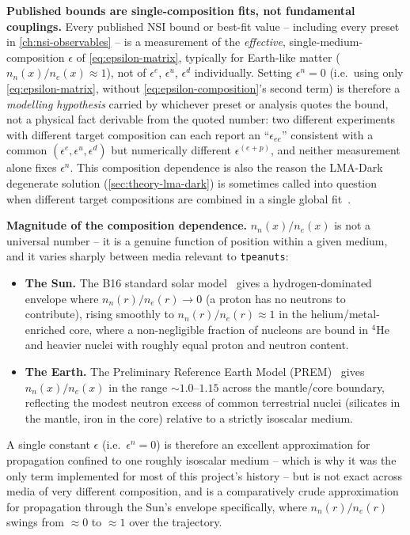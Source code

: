 \begin{notebox}
\textbf{Published bounds are single-composition fits, not fundamental
couplings.} Every published NSI bound or best-fit value -- including every
preset in \cref{ch:nsi-observables} -- is a measurement of the
\emph{effective}, single-medium-composition $\epsilon$ of
\cref{eq:epsilon-matrix}, typically for Earth-like matter
($n_n(x)/n_e(x)\approx1$), not of $\epsilon^{e}$, $\epsilon^{u}$,
$\epsilon^{d}$ individually. Setting $\epsilon^{n}=0$ (i.e.\ using only
\cref{eq:epsilon-matrix}, without \cref{eq:epsilon-composition}'s second
term) is therefore a \emph{modelling hypothesis} carried by whichever
preset or analysis quotes the bound, not a physical fact derivable from the
quoted number: two different experiments with different target composition
can each report an ``$\epsilon_{ee}$'' consistent with a common
$(\epsilon^e,\epsilon^u,\epsilon^d)$ but numerically different
$\epsilon^{(e+p)}$, and neither measurement alone fixes $\epsilon^n$. This
composition dependence is also the reason the LMA-Dark degenerate solution
(\cref{sec:theory-lma-dark}) is sometimes called into question when
different target compositions are combined in a single global
fit~\parencite{ColomaEtAl2017DarkSide}.
\end{notebox}

\begin{theorybox}
\textbf{Magnitude of the composition dependence.} $n_n(x)/n_e(x)$ is not a
universal number -- it is a genuine function of position within a given
medium, and it varies sharply between media relevant to
\texttt{tpeanuts}:
\begin{itemize}
  \item \textbf{The Sun.} The B16 standard solar
    model~\parencite{Vinyoles2017B16} gives a hydrogen-dominated envelope
    where $n_n(r)/n_e(r)\to0$ (a proton has no neutrons to contribute), rising
    smoothly to $n_n(r)/n_e(r)\approx1$ in the helium/metal-enriched core,
    where a non-negligible fraction of nucleons are bound in $^4$He and
    heavier nuclei with roughly equal proton and neutron content.
  \item \textbf{The Earth.} The Preliminary Reference Earth Model
    (PREM)~\parencite{DziewonskiAnderson1981} gives $n_n(x)/n_e(x)$ in the
    range $\sim1.0$--$1.15$ across the mantle/core boundary, reflecting the
    modest neutron excess of common terrestrial nuclei (silicates in the
    mantle, iron in the core) relative to a strictly isoscalar medium.
\end{itemize}
A single constant $\epsilon$ (i.e.\ $\epsilon^n=0$) is therefore an excellent
approximation for propagation confined to one roughly isoscalar medium --
which is why it was the only term implemented for most of this project's
history -- but is not exact across media of very different composition, and
is a comparatively crude approximation for propagation through the Sun's
envelope specifically, where $n_n(r)/n_e(r)$ swings from $\approx0$ to
$\approx1$ over the trajectory.
\end{theorybox}

